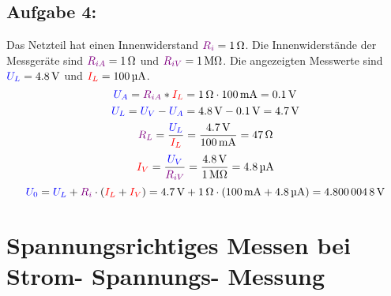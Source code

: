 \documentclass[a4paper,titlepage,parskip]{scrreprt}
\newcommand{\spannung}[1]{\textcolor{blue}{#1}}
\newcommand{\strom}[1]{\textcolor{red}{#1}}
\newcommand{\widerstand}[1]{\textcolor{violet}{#1}}
\begin{document}
           \subsection{Aufgabe 4:}Das Netzteil hat einen Innenwiderstand $\widerstand{R_i} = \SI{1}{\ohm}$. Die Innenwiderstände der Messgeräte sind $\widerstand{R_{iA}} = \SI{1}{\ohm}$ und $\widerstand{R_{iV}} = \SI{1}{\mega\ohm}$. Die angezeigten Messwerte sind $\spannung{U_L} = \SI{4,8}{\volt}$ und $\strom{I_L} = \SI{100}{\micro\ampere}$.
           \begin{equation*}
           		\spannung{U_A} = \widerstand{R_{iA}} * \strom{I_L} = \SI{1}{\ohm} \cdot \SI{100}{\milli\ampere} = \SI{0,1}{\volt}
           \end{equation*}
           \begin{equation*}
           		\spannung{U_L} = \spannung{U_V} - \spannung{U_A} = \SI{4,8}{\volt} - \SI{0,1}{\volt} = \SI{4,7}{\volt} 
           \end{equation*}
           \begin{equation*}
           		\widerstand{R_L} = \frac{\spannung{U_L}}{\strom{I_L}} = \frac{\SI{4,7}{\volt}}{\SI{100}{\milli\ampere}} = \SI{47}{\ohm}
           \end{equation*}
           \begin{equation*}
           		\strom{I_V} = \frac{\spannung{U_V}}{\widerstand{R_{iV}}} = \frac{\SI{4,8}{\volt}}{\SI{1}{\mega\ohm}} = \SI{4,8}{\micro\ampere}
           \end{equation*}
		   \begin{equation*}
		   		\spannung{U_0} = \spannung{U_L} + \widerstand{R_i} \cdot (\strom{I_L} + \strom{I_V}) = \SI{4,7}{\volt} + \SI{1}{\ohm} \cdot (\SI{100}{\milli\ampere} + \SI{4,8}{\micro\ampere}) = \SI{4,8000048}{\volt}
		   \end{equation*}
		   
       \pagebreak    
       \section{Spannungsrichtiges Messen bei Strom- Spannungs- Messung}
       
\end{document}
